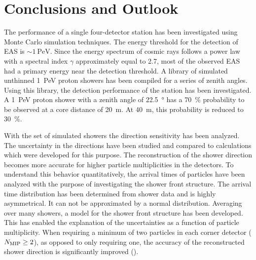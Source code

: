 \chapter{Conclusions and Outlook}
\label{ch:conclusions}

The performance of a single four-detector \hisparc station has been investigated
using Monte Carlo simulation techniques. The energy threshold for the detection of EAS is
$\sim \SI{1}{\peta\electronvolt}$. Since the energy spectrum of cosmic rays follows a
power law with a spectral index $\gamma$ approximately equal to 2.7, most
of the observed EAS had a primary energy near the detection threshold.
A library of simulated unthinned \SI{1}{\peta\electronvolt} proton showers has
been compiled for a series of zenith angles. Using this library, the detection
performance of the station has been investigated. A \SI{1}{\peta\electronvolt}
proton shower with a zenith angle of \SI{22.5}{\degree} has a
\SI{70}{\percent} probability to be observed at a core distance of
\SI{20}{\meter}. At \SI{40}{\meter}, this probability is reduced to
\SI{30}{\percent}.

With the set of simulated showers the direction sensitivity has been analyzed.
The uncertainty in the directions have been studied and compared to calculations
which were developed for this purpose.
The reconstruction of the shower direction becomes more accurate for higher
particle multiplicities in the detectors. To understand this behavior
quantitatively, the arrival times of particles have been analyzed with the
purpose of investigating the shower front structure.
The arrival time distribution has been determined from shower data and is highly
asymmetrical. It can not be approximated by a normal distribution. Averaging
over many showers, a model for the shower front structure has been developed.
This has enabled the explanation of the uncertainties as a function of particle
multiplicity. When requiring a minimum of two particles in each corner detector
($N_\mathrm{\mip} \geq 2$), as opposed to only requiring one, the accuracy of
the reconstructed shower direction is significantly improved
().

